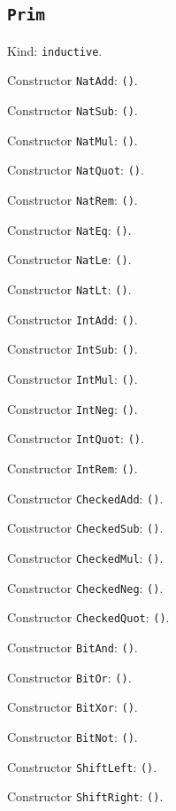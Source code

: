 \documentclass[11pt]{article}
\begin{document}
\subsection*{\texttt{Prim}}
\noindent Kind: \texttt{inductive}.\par
\noindent Constructor \texttt{NatAdd}: \texttt{()}.\par
\noindent Constructor \texttt{NatSub}: \texttt{()}.\par
\noindent Constructor \texttt{NatMul}: \texttt{()}.\par
\noindent Constructor \texttt{NatQuot}: \texttt{()}.\par
\noindent Constructor \texttt{NatRem}: \texttt{()}.\par
\noindent Constructor \texttt{NatEq}: \texttt{()}.\par
\noindent Constructor \texttt{NatLe}: \texttt{()}.\par
\noindent Constructor \texttt{NatLt}: \texttt{()}.\par
\noindent Constructor \texttt{IntAdd}: \texttt{()}.\par
\noindent Constructor \texttt{IntSub}: \texttt{()}.\par
\noindent Constructor \texttt{IntMul}: \texttt{()}.\par
\noindent Constructor \texttt{IntNeg}: \texttt{()}.\par
\noindent Constructor \texttt{IntQuot}: \texttt{()}.\par
\noindent Constructor \texttt{IntRem}: \texttt{()}.\par
\noindent Constructor \texttt{CheckedAdd}: \texttt{()}.\par
\noindent Constructor \texttt{CheckedSub}: \texttt{()}.\par
\noindent Constructor \texttt{CheckedMul}: \texttt{()}.\par
\noindent Constructor \texttt{CheckedNeg}: \texttt{()}.\par
\noindent Constructor \texttt{CheckedQuot}: \texttt{()}.\par
\noindent Constructor \texttt{BitAnd}: \texttt{()}.\par
\noindent Constructor \texttt{BitOr}: \texttt{()}.\par
\noindent Constructor \texttt{BitXor}: \texttt{()}.\par
\noindent Constructor \texttt{BitNot}: \texttt{()}.\par
\noindent Constructor \texttt{ShiftLeft}: \texttt{()}.\par
\noindent Constructor \texttt{ShiftRight}: \texttt{()}.\par
\end{document}
